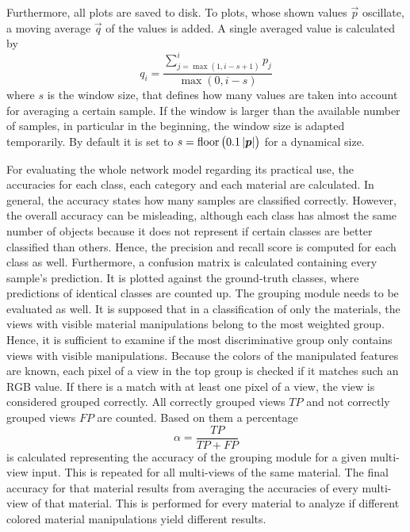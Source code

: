 Furthermore, all plots are saved to disk.
To plots, whose shown values $\vec{p}$ oscillate, a moving average $\vec{q}$ of the values is added.
A single averaged value is calculated by
\begin{equation}
	q_i = \frac{\sum_{j = \max(1,i-s+1)}^{i} p_j}{\max(0,i-s)}
\end{equation}
where $s$ is the window size, that defines how many values are taken into account for averaging a certain sample.
If the window is larger than the available number of samples, in particular in the beginning, the window size is adapted temporarily.
By default it is set to $s=\operatorname{floor}\left( 0.1 \left| \bm{p} \right| \right)$ for a dynamical size.

For evaluating the whole network model regarding its practical use, the accuracies for each class, each category and each material are calculated.
In general, the accuracy states how many samples are classified correctly.
However, the overall accuracy can be misleading, although each class has almost the same number of objects because it does not represent if certain classes are better classified than others.
Hence, the precision and recall score is computed for each class as well.
Furthermore, a confusion matrix is calculated containing every sample's prediction.
It is plotted against the ground-truth classes, where predictions of identical classes are counted up.
The grouping module needs to be evaluated as well.
It is supposed that in a classification of only the materials, the views with visible material manipulations belong to the most weighted group.
Hence, it is sufficient to examine if the most discriminative group only contains views with visible manipulations.
Because the colors of the manipulated features are known, each pixel of a view in the top group is checked if it matches such an RGB value.
If there is a match with at least one pixel of a view, the view is considered grouped correctly.
All correctly grouped views $TP$ and not correctly grouped views $FP$ are counted.
Based on them a percentage
\begin{equation}
	\label{eq:metric-group}
	\alpha = \frac{TP}{TP + FP}
\end{equation}
is calculated representing the accuracy of the grouping module for a given multi-view input.
This is repeated for all multi-views of the same material.
The final accuracy for that material results from averaging the accuracies of every multi-view of that material.
This is performed for every material to analyze if different colored material manipulations yield different results. 

